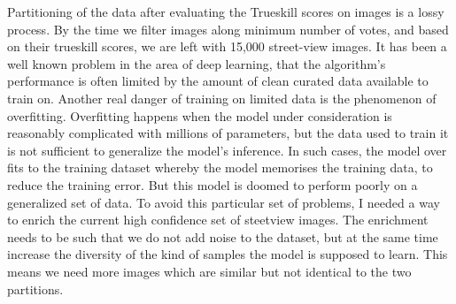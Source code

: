 Partitioning of the data after evaluating the Trueskill scores on images is a lossy process. By the time we filter images along minimum number of votes, and based on their trueskill scores, we are left with 15,000 street-view images. It has been a well known problem in the area of deep learning, that the algorithm's performance is often limited by the amount of clean curated data available to train on. Another real danger of training on limited data is the phenomenon of overfitting. Overfitting happens when the model under consideration is reasonably complicated with millions of parameters, but the data used to train it is not sufficient to generalize the model's inference. In such cases, the model over fits to the training dataset whereby the model memorises the training data, to reduce the training error. But this model is doomed to perform poorly on a generalized set of data. To avoid this particular set of problems, I needed a way to enrich the current high confidence set of steetview images. The enrichment needs to be such that we do not add noise to the dataset, but at the same time increase the diversity of the kind of samples the model is supposed to learn. This means we need more images which are similar but not identical to the two partitions. 

